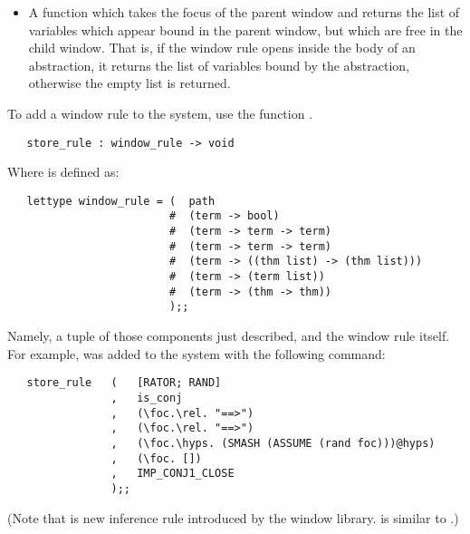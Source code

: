 \begin{itemize}
	\item   A function which takes the focus of the parent window
		and returns the list of variables which appear
		bound in the parent window, but which are free in the
		child window.
		That is, if the window rule opens inside the body of 
		an abstraction, it returns the list of variables bound by
		the abstraction, otherwise the empty list is returned.
\end{itemize}
To add a window rule to the system, use the function
.
\begin{boxed}\begin{verbatim}
   store_rule : window_rule -> void
\end{verbatim}\end{boxed}
Where  is defined as:
\begin{verbatim}
   lettype window_rule = (  path
                         #  (term -> bool)
                         #  (term -> term -> term)
                         #  (term -> term -> term)
                         #  (term -> ((thm list) -> (thm list)))
                         #  (term -> (term list))
                         #  (term -> (thm -> thm))
                         );;
\end{verbatim}
Namely, a tuple of those components just described, and the window rule 
itself.
For example,  was added to the system with the
following command:
\begin{verbatim}
   store_rule   (   [RATOR; RAND]
                ,   is_conj
                ,   (\foc.\rel. "==>")
                ,   (\foc.\rel. "==>")
                ,   (\foc.\hyps. (SMASH (ASSUME (rand foc)))@hyps)
                ,   (\foc. [])
                ,   IMP_CONJ1_CLOSE
                );;
\end{verbatim}
(Note that  is new inference rule introduced by the window library.
  is similar to .)

